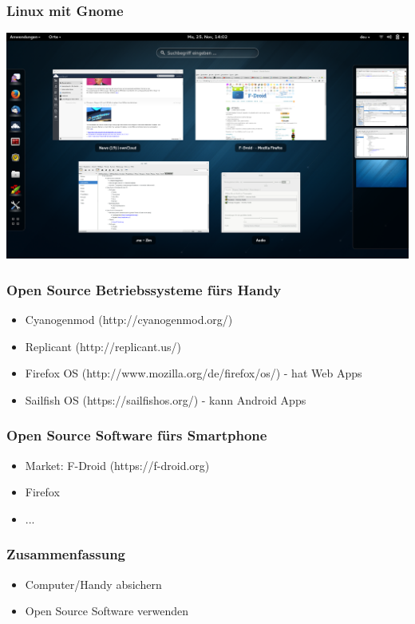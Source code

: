 \documentclass[12pt]{beamer}
\begin{document}
\begin{frame}
    \frametitle{Linux mit Gnome}
    \begin{center}
      \includegraphics[height=0.7\textheight]{img/gnome.png}
    \end{center}
\end{frame}

\begin{frame}
    \frametitle{Open Source Betriebssysteme fürs Handy}
    \begin{itemize}
      \item Cyanogenmod (http://cyanogenmod.org/)
      \item Replicant (http://replicant.us/)
      \item Firefox OS (http://www.mozilla.org/de/firefox/os/) - hat Web Apps
      \item Sailfish OS (https://sailfishos.org/) - kann Android Apps
    \end{itemize}
\end{frame}

\begin{frame}
    \frametitle{Open Source Software fürs Smartphone}
    \begin{itemize}
      \item Market: F-Droid (https://f-droid.org)
      \item Firefox
      \item ...
    \end{itemize}
\end{frame}

\begin{frame}
    \frametitle{Zusammenfassung}
    \begin{itemize}
      \item Computer/Handy absichern
      \item Open Source Software verwenden
    \end{itemize}
\end{frame}
\end{document}
